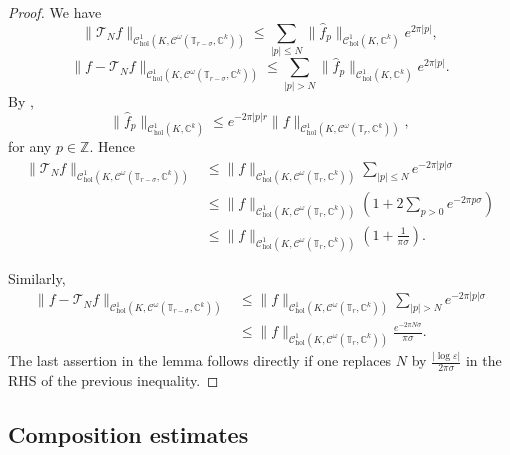 \documentclass[10pt]{article}
\newcommand{\Z}{\mathbb{Z}}
\newcommand{\C}{\mathbb{C}}
\newcommand{\T}{\mathbb{T}}
\newcommand{\CC}{\mathbb{C}}
\begin{document}
\begin{proof}
We have
\[
\|\mathscr T_N f\|_{\mathscr C^1_{\text{hol}}(K,\mathscr C^{\omega}(\T_{r-\sigma},\C^k))} 
\leq 
\sum_{|p|\leq N} \|\widehat f_p\|_{\mathscr C^1_{\text{hol}}(K,\C^k)}e^{2\pi|p|},
\]
\[
\|f - \mathscr T_N f\|_{\mathscr C^1_{\text{hol}}(K,\mathscr C^{\omega}(\T_{r-\sigma},\C^k))} 
\leq 
\sum_{|p|> N} \|\widehat f_p\|_{\mathscr C^1_{\text{hol}}(K,\CC^k)}e^{2\pi|p|}.
\]
By \cite[Corollary 10]{CMS},
\[
\|\widehat f_p\|_{\mathscr C^1_{\text{hol}}(K,\C^k)} 
\leq 
e^{-2\pi |p|r}\|f\|_{\mathscr C^1_{\text{hol}}(K,\mathscr C^{\omega}(\T_{r},\C^k))},
\]
for any $p \in \Z$. Hence
\begin{align*}
\|\mathscr T_N f\|_{\mathscr C^1_{\text{hol}}(K,\mathscr C^{\omega}(\T_{r-\sigma},\C^k))} 
&\leq 
\|f\|_{\mathscr C^1_{\text{hol}}(K,\mathscr C^{\omega}(\T_{r},\C^k))}
\sum_{|p|\leq N} e^{-2\pi|p|\sigma} \\
& \leq 
\|f\|_{\mathscr C^1_{\text{hol}}(K,\mathscr C^{\omega}(\T_{r},\C^k))} 
\left( 1+2\sum_{p>0}e^{-2\pi p\sigma} \right) \\ 
& \leq \|f\|_{\mathscr C^1_{\text{hol}}(K,\mathscr C^{\omega}(\T_{r},\C^k))} 
\left( 1 + \frac{1}{\pi\sigma}\right).
\end{align*}

Similarly,
\begin{align*}
\|f - \mathscr T_N f\|_{\mathscr C^1_{\text{hol}}(K,\mathscr C^{\omega}(\T_{r-\sigma},\C^k))} 
& \leq 
\|f\|_{\mathscr C^1_{\text{hol}}(K,\mathscr C^{\omega}(\T_{r},\C^k))}
\sum_{|p| > N} e^{-2\pi|p|\sigma} \\ 
& \leq 
\|f\|_{\mathscr C^1_{\text{hol}}(K,\mathscr C^{\omega}(\T_{r},\C^k))}
\frac{e^{-2\pi N\sigma}}{\pi\sigma}.
\end{align*}
The last assertion in the lemma follows directly if one replaces $N$ by $\tfrac{\left| \log \varepsilon \right|}{2\pi\sigma}$ in the RHS of the previous inequality.
\end{proof}

\subsection{Composition estimates}
\end{document}
